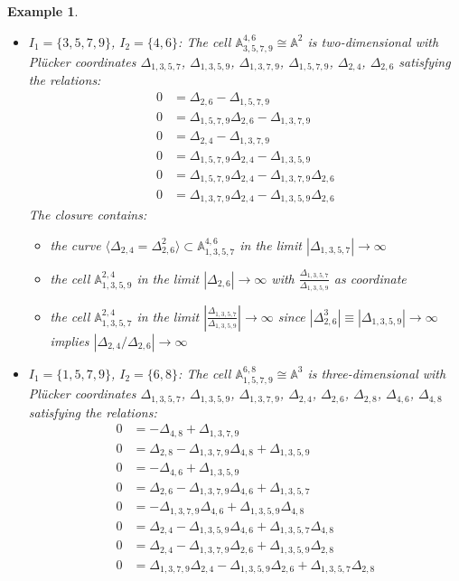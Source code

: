 \documentclass{amsart}
\newtheorem{example}[theorem]{Example}
\numberwithin{equation}{section}
\renewcommand{\AA}{\mathbb{A}}
\begin{document}
\begin{example}
\begin{itemize}
      \item $I_1=\{3,5,7,9\}$, $I_2=\{4,6\}$: The cell $\AA_{3,5,7,9}^{4,6} \cong \AA^2$ is two-dimensional with Pl\"ucker coordinates $\Delta_{1,3,5,7}$, $\Delta_{1,3,5,9}$, $\Delta_{1,3,7,9}$, $\Delta_{1,5,7,9}$, $\Delta_{2,4}$, $\Delta_{2,6}$ satisfying the relations:
        \begin{align*}
          0 &= \Delta_{2,6} - \Delta_{1,5,7,9}\\
          0 &= \Delta_{1,5,7,9}\Delta_{2,6} - \Delta_{1,3,7,9}\\
          0 &= \Delta_{2,4} - \Delta_{1,3,7,9}\\
          0 &= \Delta_{1,5,7,9}\Delta_{2,4} - \Delta_{1,3,5,9}\\
          0 &= \Delta_{1,5,7,9}\Delta_{2,4} - \Delta_{1,3,7,9}\Delta_{2,6}\\
          0 &= \Delta_{1,3,7,9}\Delta_{2,4} - \Delta_{1,3,5,9}\Delta_{2,6}
        \end{align*}
        The closure contains:
        \begin{itemize}
          \item the curve $\langle \Delta_{2,4}=\Delta_{2,6}^2 \rangle \subset \AA_{1,3,5,7}^{4,6}$ in the limit $|\Delta_{1,3,5,7}|\to\infty$
          \item the cell $\AA_{1,3,5,9}^{2,4}$ in the limit $|\Delta_{2,6}|\to\infty$ with $\frac{\Delta_{1,3,5,7}}{\Delta_{1,3,5,9}}$ as coordinate
          \item the cell $\AA_{1,3,5,7}^{2,4}$ in the limit $|\frac{\Delta_{1,3,5,7}}{\Delta_{1,3,5,9}}|\to\infty$ since $|\Delta_{2,6}^3|\equiv|\Delta_{1,3,5,9}|\to\infty$ implies $|\Delta_{2,4}/\Delta_{2,6}|\to\infty$
        \end{itemize}

      \item $I_1=\{1,5,7,9\}$, $I_2=\{6,8\}$: The cell $\AA_{1,5,7,9}^{6,8} \cong \AA^3$ is three-dimensional with Pl\"ucker coordinates $\Delta_{1,3,5,7}$, $\Delta_{1,3,5,9}$, $\Delta_{1,3,7,9}$, $\Delta_{2,4}$, $\Delta_{2,6}$, $\Delta_{2,8}$, $\Delta_{4,6}$, $\Delta_{4,8}$ satisfying the relations:
      \begin{align*}
        0 &= -\Delta_{4,8} + \Delta_{1,3,7,9}\\
        0 &= \Delta_{2,8} - \Delta_{1,3,7,9}\Delta_{4,8} + \Delta_{1,3,5,9}\\
        0 &= -\Delta_{4,6} + \Delta_{1,3,5,9}\\
        0 &= \Delta_{2,6} - \Delta_{1,3,7,9}\Delta_{4,6} + \Delta_{1,3,5,7}\\
        0 &= - \Delta_{1,3,7,9}\Delta_{4,6} + \Delta_{1,3,5,9}\Delta_{4,8}\\
        0 &= \Delta_{2,4} - \Delta_{1,3,5,9}\Delta_{4,6} + \Delta_{1,3,5,7}\Delta_{4,8}\\
        0 &= \Delta_{2,4} - \Delta_{1,3,7,9}\Delta_{2,6} + \Delta_{1,3,5,9}\Delta_{2,8}\\
        0 &= \Delta_{1,3,7,9}\Delta_{2,4} - \Delta_{1,3,5,9}\Delta_{2,6} + \Delta_{1,3,5,7}\Delta_{2,8}
      \end{align*}


\end{itemize}
\end{example}
\end{document}
